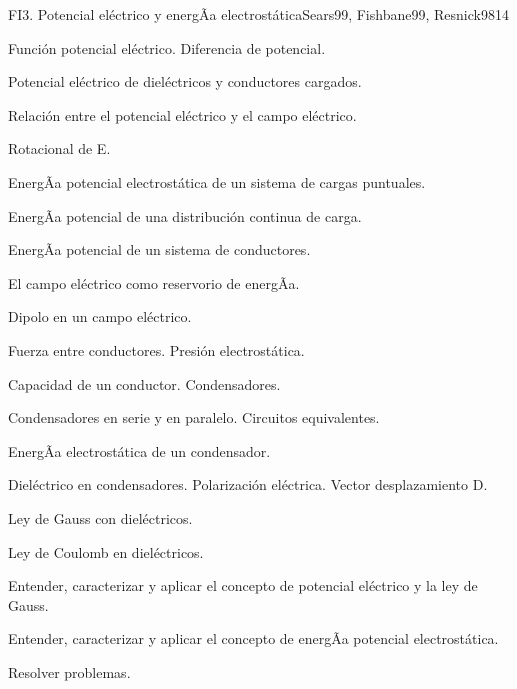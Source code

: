 \begin{syllabus}
\begin{unit}{FI3. Potencial eléctrico y energÃ­a electrostática}{Sears99, Fishbane99, Resnick98}{14}
   \begin{topics}
         \item  Función potencial eléctrico. Diferencia de potencial.
	 \item  Potencial eléctrico de dieléctricos y conductores cargados.
         \item  Relación entre el potencial eléctrico y el campo eléctrico.
	 \item  Rotacional de E.
         \item  EnergÃ­a potencial electrostática de un sistema de cargas puntuales.
	 \item  EnergÃ­a potencial de una distribución continua de carga.
         \item  EnergÃ­a potencial de un sistema de conductores.
	 \item  El campo eléctrico como reservorio de energÃ­a.
         \item  Dipolo en un campo eléctrico.
         \item  Fuerza entre conductores.  Presión electrostática.
         \item  Capacidad de un conductor. Condensadores.
         \item  Condensadores en serie y en paralelo.  Circuitos equivalentes.
         \item  EnergÃ­a electrostática de un condensador.
         \item  Dieléctrico en condensadores.  Polarización eléctrica.  Vector desplazamiento D.
         \item  Ley de Gauss con dieléctricos.
         \item  Ley de Coulomb en dieléctricos.
   \end{topics}

   \begin{unitgoals}
         \item  Entender, caracterizar y aplicar el concepto de potencial eléctrico y la ley de Gauss.
         \item  Entender, caracterizar y aplicar el concepto de energÃ­a potencial electrostática.
         \item  Resolver problemas.
   \end{unitgoals}
\end{unit}


\end{syllabus}
